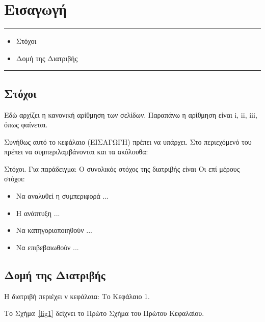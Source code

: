 \chapter{Εισαγωγή}
\label{ch:intro}
\hrule\vspace{0.2in}
\begin{itemize}
  \item[\ref{sec:11}] Στόχοι
  \item[\ref{sec:12}] Δομή της Διατριβής
\end{itemize}
\hrule \vspace{0.2in}



\section{Στόχοι}\label{sec:11}
Εδώ αρχίζει η κανονική αρίθμηση των σελίδων. Παραπάνω η αρίθμηση
είναι i, ii, iii, όπως φαίνεται.

Συνήθως αυτό το κεφάλαιο (ΕΙΣΑΓΩΓΗ) πρέπει να υπάρχει. Στο
περιεχόμενό του πρέπει να συμπεριλαμβάνονται και τα ακόλουθα:

\y Στόχοι. Για παράδειγμα: Ο συνολικός στόχος της διατριβής είναι
Οι επί μέρους στόχοι:
\begin{itemize}
\item Να αναλυθεί η συμπεριφορά ...
\item Η ανάπτυξη  ...
\item Να κατηγοριοποιηθούν  ...
\item Να επιβεβαιωθούν  ...
\end{itemize}




\section{Δομή της Διατριβής}\label{sec:12}
Η διατριβή περιέχει ν κεφάλαια: Το Κεφάλαιο 1.


\newpage
Το Σχήμα~\ref{fig1} δείχνει το Πρώτο Σχήμα του Πρώτου Κεφαλαίου.

